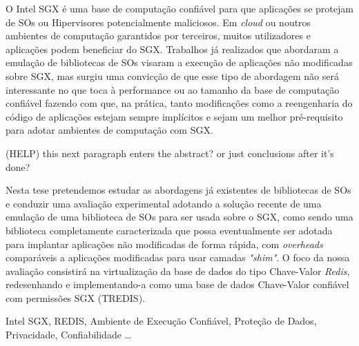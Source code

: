 
	O Intel SGX é uma base de computação confiável para que aplicações se protejam de SOs ou Hipervisores potencialmente maliciosos. Em \textit{cloud} ou noutros ambientes de computação garantidos por terceiros, muitos utilizadores e aplicações podem beneficiar do SGX. Trabalhos já realizados que abordaram a emulação de bibliotecas de SOs visaram a execução de aplicações não modificadas sobre SGX, mas surgiu uma convicção de que esse tipo de abordagem não será interessante no que toca à performance ou ao tamanho da base de computação confiável fazendo com que, na prática, tanto modificações como a reengenharia do código de aplicações estejam sempre implícitos e sejam um melhor pré-requisito para adotar ambientes de computação com SGX.
	
	(HELP) this next paragraph enters the abstract? or just conclusions after it's done?
	
	Nesta tese pretendemos estudar as abordagens já existentes de bibliotecas de SOs e conduzir uma avaliação experimental adotando a solução recente de uma emulação de uma biblioteca de SOs para ser usada sobre o SGX, como sendo uma biblioteca completamente caracterizada que possa eventualmente ser adotada para implantar aplicações não modificadas de forma rápida, com \textit{overheads} comparáveis a aplicações modificadas para usar camadas \textit{"shim"}. O foco da nossa avaliação consistirá na virtualização da base de dados do tipo Chave-Valor  \textit{Redis}, redesenhando e implementando-a como uma base de dados Chave-Valor confiável com permissões SGX (TREDIS).
	
\begin{keywords}
Intel SGX, REDIS, Ambiente de Execução Confiável, Proteção de Dados, Privacidade, Confiabilidade \ldots
\end{keywords}


	
